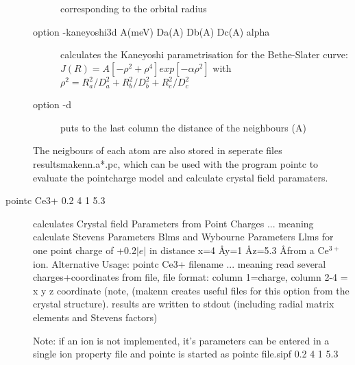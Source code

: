 \begin{description}
\begin{description}
corresponding
                               to the orbital radius
\item[option {\prg -kaneyoshi3d A(meV) Da(A) Db(A) Dc(A) alpha}] calculates the Kaneyoshi %
parametrisation for the Bethe-Slater
                               curve: $J(R)= A [-\rho^2+\rho^4]exp[-\alpha \rho^2]$  with %
$\rho^2=R_a^2/D_a^2+R_b^2/D_b^2+R_c^2/D_c^2$
\item[option {\prg -d}] puts to the last column the distance of the neighbours (A)
\end{description}
The neigbours of each atom are also stored in seperate files
{\prg results\/makenn.a*.pc}, which can be used with the program {\prg pointc} to evaluate
the pointcharge model and calculate crystal field paramaters.

\item [\prg pointc\index{pointc} Ce3+ 0.2 4 1 5.3]
              calculates Crystal field Parameters from Point Charges  
                 ... meaning calculate Stevens Parameters Blms 
                                  and Wybourne Parameters Llms
                 for one point charge of +0.2$|e|$ in distance
                 x=4 \AA y=1 \AA z=5.3 \AA from a Ce$^{3+}$ ion.
                Alternative Usage: pointc Ce3+ filename
                 ... meaning read several charges+coordinates from file,
                 file format: column 1=charge, column 2-4 = x y z coordinate  (note,
				 ({\prg makenn} creates useful files for this option from the crystal %
structure).
                results are written to stdout (including radial matrix elements and Stevens %
factors)

                Note: if an ion is not implemented, it's parameters can be 
                      entered in a single ion property file and pointc is
                      started as 
                        pointc file.sipf 0.2 4 1 5.3


\end{description}
